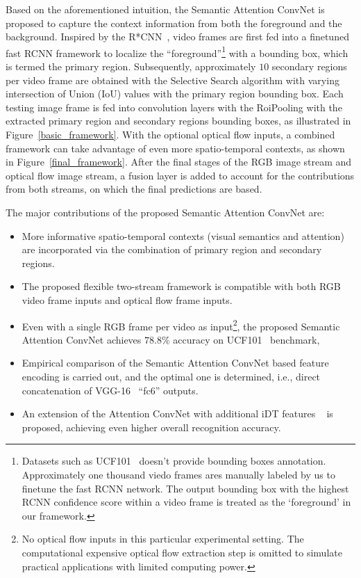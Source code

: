 \documentclass[10pt,twocolumn,letterpaper]{article}
\begin{document}
Based on the aforementioned intuition, the Semantic Attention ConvNet is proposed to capture the context information from both the foreground and the background. Inspired by the R*CNN~\cite{gkioxari2015contextual}, video frames are first fed into a finetuned fast RCNN framework to localize the ``foreground''\footnote{Datasets such as UCF101~\cite{soomro2012ucf101} doesn't provide bounding boxes annotation. Approximately one thousand viedo frames ares manually labeled by us to finetune the fast RCNN network. The output bounding box with the highest RCNN confidence score within a video frame is treated as the `foreground' in our framework.} with a bounding box, which is termed the {{primary region}}. Subsequently, approximately $10$ {{secondary regions}} per video frame are obtained with the Selective Search algorithm \cite{van2011segmentation} with varying intersection of Union (IoU) values with the primary region bounding box. Each testing image frame is fed into convolution layers with the RoiPooling\cite{girshick2016region} with the extracted primary region and secondary regions bounding boxes, as illustrated in Figure~\ref{basic_framework}. With the optional optical flow inputs, a combined framework can take advantage of even more spatio-temporal contexts, as shown in Figure~\ref{final_framework}. After the final stages of the RGB image stream and optical flow image stream, a fusion layer is added to account for the contributions from both streams, on which the final predictions are based.

The major contributions of the proposed Semantic Attention ConvNet are:
\noindent 
%
\begin{itemize}[leftmargin=*,itemsep=0cm,topsep=0cm,parsep=0cm] %
%
\item More informative spatio-temporal contexts (visual semantics and attention) are incorporated via the combination of primary region and secondary regions. 
\item The proposed flexible two-stream framework is compatible with both RGB video frame inputs and optical flow frame inputs. 
\item Even with a single RGB frame per video as input\footnote{No optical flow inputs in this particular experimental setting. The computational expensive optical flow extraction step is omitted to simulate practical applications with limited computing power.}, the proposed Semantic Attention ConvNet achieves $78.8\%$ accuracy on UCF101~\cite{soomro2012ucf101} benchmark, 
\item Empirical comparison of the Semantic Attention ConvNet based feature encoding is carried out, and the optimal one is determined, i.e., direct concatenation of VGG-16~\cite{simonyan2014very} ``fc6'' outputs.
\item An extension of the Attention ConvNet with additional iDT features ~\cite{wang2013action} is proposed, achieving even higher overall recognition accuracy.
%
\end{itemize}
%
\end{document}
